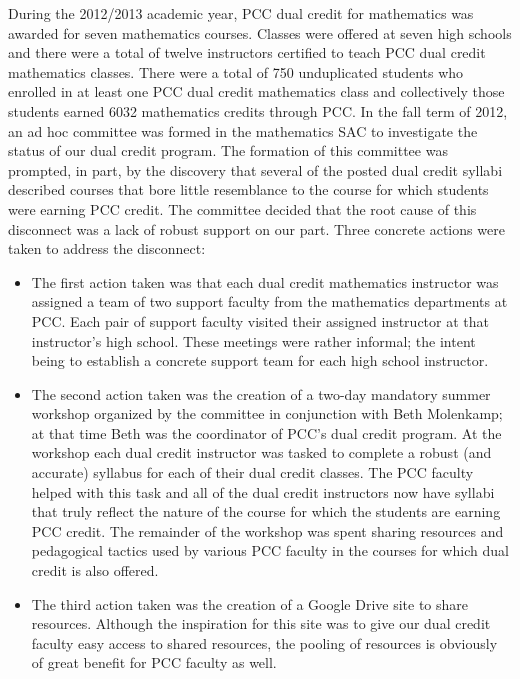 During the 2012/2013 academic year, PCC dual credit for mathematics was awarded for seven mathematics courses.  Classes were offered at seven high schools and there were a total of twelve instructors certified to teach PCC dual credit mathematics classes.  There were a total of 750 unduplicated students who enrolled in at least one PCC dual credit mathematics class and collectively those students earned 6032 mathematics credits through PCC.
In the fall term of 2012, an ad hoc committee was formed in the mathematics SAC to investigate the status of our dual credit program.  The formation of this committee was prompted, in part, by the discovery that several of the posted dual credit syllabi described courses that bore little resemblance to the course for which students were earning PCC credit.  The committee decided that the root cause of this disconnect was a lack of robust support on our part.  Three concrete actions were taken to address the disconnect:
\begin{itemize}
\item The first action taken was that each dual credit mathematics instructor was assigned a team of two support faculty from the mathematics departments at PCC.  Each pair of support faculty visited their assigned instructor at that instructor's high school.  These meetings were rather informal; the intent being to establish a concrete support team for each high school instructor.
\item The second action taken was the creation of a two-day mandatory summer workshop organized by the committee in conjunction with Beth Molenkamp; at that time Beth was the coordinator of PCC's dual credit program.  At the workshop each dual credit instructor was tasked to complete a robust (and accurate) syllabus for each of their dual credit classes.  The PCC faculty helped with this task and all of the dual credit instructors now have syllabi that truly reflect the nature of the course for which the students are earning PCC credit.  The remainder of the workshop was spent sharing resources and pedagogical tactics used by various PCC faculty in the courses for which dual credit is also offered.
\item The third action taken was the creation of a Google Drive site to share resources.  Although the inspiration for this site was to give our dual credit faculty easy access to shared resources, the pooling of resources is obviously of great benefit for PCC faculty as well.
\end{itemize}

